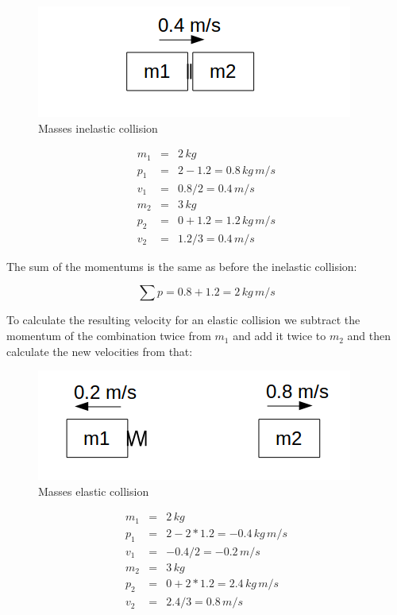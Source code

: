 \begin{figure}[ht] \centering
	\includegraphics[scale=.5]{mms5} \caption{Masses inelastic collision}
\end{figure}

\begin{eqnarray}
m_1 &=& 2 \, kg \\
p_1 &=& 2 - 1.2 = 0.8 \, kg \, m/s \\
v_1 &=& 0.8 / 2 = 0.4 \, m/s \\
m_2 &=& 3 \, kg \\
p_2 &=& 0 + 1.2 = 1.2 \, kg \, m/s \\
v_2 &=& 1.2 / 3 = 0.4 \, m/s
\end{eqnarray}

The sum of the momentums is the same as before the inelastic collision:

\begin{equation}
\sum p = 0.8 + 1.2 = 2 \, kg \, m/s
\end{equation}

To calculate the resulting velocity for an elastic collision we subtract the momentum of the combination twice from $m_1$ and add it twice to $m_2$ and then calculate the new velocities from that:

\begin{figure}[ht] \centering
	\includegraphics[scale=.5]{mms6} \caption{Masses elastic collision}
\end{figure}

\begin{eqnarray}
m_1 &=& 2 \, kg \\
p_1 &=& 2 - 2*1.2 = -0.4 \, kg \, m/s \\
v_1 &=& -0.4 / 2 = -0.2 \, m/s \\
m_2 &=& 3 \, kg \\
p_2 &=& 0 + 2*1.2 = 2.4 \, kg \, m/s \\
v_2 &=& 2.4 / 3 = 0.8 \, m/s
\end{eqnarray}

